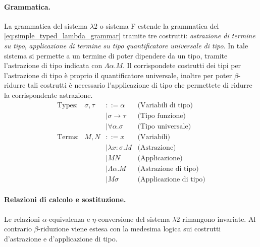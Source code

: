 \paragraph{Grammatica.}
La grammatica del sistema $\lambda 2$ o sistema F estende la grammatica del \ref{eq:simple_typed_lambda_grammar} tramite tre costrutti:
\emph{astrazione di termine su tipo}, \emph{applicazione di termine su tipo} \emph{quantificatore universale di tipo}. In tale sistema si permette a un termine di poter dipendere
da un tipo, tramite l'astrazione di tipo indicata con $\Lambda \alpha. M$. Il corrispondete costrutti dei tipi per l'astrazione di tipo è proprio il 
quantificatore universale, inoltre per poter $\beta$-ridurre tali costrutti è necessario l'applicazione di tipo che permettete di ridurre la corrispondente astrazione.
\begin{equation}
    \begin{array}{lrll}
    \text{Types:}   & \sigma, \tau & ::= \alpha                     & \text{(Variabili di tipo)}    \\
                    &              & \mid \sigma \to \tau           & \text{(Tipo funzione)}        \\
                    &              & \mid \forall \alpha. \sigma    & \text{(Tipo universale)}      \\
    \text{Terms:}   & M, N         & ::= x                          & \text{(Variabili)}            \\
                    &              & \mid \lambda x : \sigma.M      & \text{(Astrazione)}           \\
                    &              & \mid M N                       & \text{(Applicazione)}         \\
                    &              & \mid \Lambda \alpha. M         & \text{(Astrazione di tipo)}   \\
                    &              & \mid M \sigma                  & \text{(Applicazione di tipo)}
    \end{array}
    \tag{System F}
    \label{eq:grammar-system-f}
\end{equation}

\paragraph{Relazioni di calcolo e sostituzione.}
Le relazioni $\alpha$-equivalenza e $\eta$-conversione del sistema $\lambda 2$ rimangono invariate. Al 
contrario $\beta$-riduzione viene estesa con la medesima logica sui costrutti d'astrazione e d'applicazione di tipo. 

